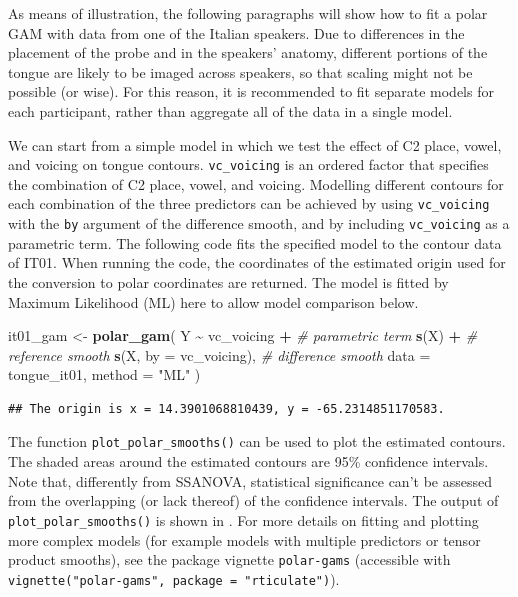 \documentclass[
  11pt,
]{article}
\newenvironment{Shaded}{\begin{snugshade}}{\end{snugshade}}
\newcommand{\CommentTok}[1]{\textcolor[rgb]{0.56,0.35,0.01}{\textit{#1}}}
\newcommand{\DataTypeTok}[1]{\textcolor[rgb]{0.13,0.29,0.53}{#1}}
\newcommand{\KeywordTok}[1]{\textcolor[rgb]{0.13,0.29,0.53}{\textbf{#1}}}
\newcommand{\NormalTok}[1]{#1}
\newcommand{\OperatorTok}[1]{\textcolor[rgb]{0.81,0.36,0.00}{\textbf{#1}}}
\newcommand{\StringTok}[1]{\textcolor[rgb]{0.31,0.60,0.02}{#1}}
\begin{document}
As means of illustration, the following paragraphs will show how to fit
a polar GAM with data from one of the Italian speakers. Due to
differences in the placement of the probe and in the speakers' anatomy,
different portions of the tongue are likely to be imaged across
speakers, so that scaling might not be possible (or wise). For this
reason, it is recommended to fit separate models for each participant,
rather than aggregate all of the data in a single model.

We can start from a simple model in which we test the effect of C2
place, vowel, and voicing on tongue contours. \texttt{vc\_voicing} is an
ordered factor that specifies the combination of C2 place, vowel, and
voicing. Modelling different contours for each combination of the three
predictors can be achieved by using \texttt{vc\_voicing} with the
\texttt{by} argument of the difference smooth, and by including
\texttt{vc\_voicing} as a parametric term. The following code fits the
specified model to the contour data of IT01. When running the code, the
coordinates of the estimated origin used for the conversion to polar
coordinates are returned. The model is fitted by Maximum Likelihood (ML)
here to allow model comparison below.

\begin{Shaded}
\begin{Highlighting}[]
\NormalTok{it01\_gam \textless{}{-}}\StringTok{ }\KeywordTok{polar\_gam}\NormalTok{(}
\NormalTok{  Y }\OperatorTok{\textasciitilde{}}
\StringTok{    }\NormalTok{vc\_voicing }\OperatorTok{+}\StringTok{            }\CommentTok{\# parametric term}
\StringTok{    }\KeywordTok{s}\NormalTok{(X) }\OperatorTok{+}\StringTok{                  }\CommentTok{\# reference smooth}
\StringTok{    }\KeywordTok{s}\NormalTok{(X, }\DataTypeTok{by =}\NormalTok{ vc\_voicing),  }\CommentTok{\# difference smooth}
  \DataTypeTok{data =}\NormalTok{ tongue\_it01,}
  \DataTypeTok{method =} \StringTok{"ML"}
\NormalTok{)}
\end{Highlighting}
\end{Shaded}

\begin{verbatim}
## The origin is x = 14.3901068810439, y = -65.2314851170583.
\end{verbatim}

The function \texttt{plot\_polar\_smooths()} can be used to plot the
estimated contours. The shaded areas around the estimated contours are
95\% confidence intervals. Note that, differently from SSANOVA,
statistical significance can't be assessed from the overlapping (or lack
thereof) of the confidence intervals. The output of
\texttt{plot\_polar\_smooths()} is shown in . For more
details on fitting and plotting more complex models (for example models
with multiple predictors or tensor product smooths), see the package
vignette \texttt{polar-gams} (accessible with
\texttt{vignette("polar-gams",\ package\ =\ "rticulate")}).
\end{document}

